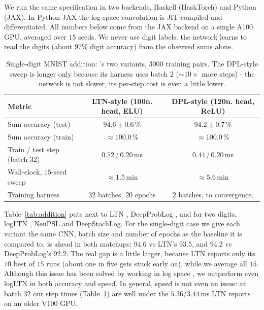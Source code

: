 \documentclass[anon]{../../journal-templates/NeSy26/nesy2026} %
\begin{document}
We run the same specification in two backends, Haskell (HaskTorch) and Python (JAX). In Python JAX the log-space convolution is JIT-compiled and
differentiated. All numbers below come from the JAX backend on a single A100 GPU, averaged over $15$
seeds. We never use digit labels: the network learns to read the digits (about $97\%$ digit accuracy)
from the observed sums alone.

\begin{table}[h]
  \centering
  \caption{Single-digit MNIST addition: \nesycattorch's two variants, $3000$ training pairs. The DPL-style sweep is longer only because its harness uses batch $2$ (${\sim}10\times$ more steps) - the network is not slower, its per-step cost is even a little lower.}
  \label{tab:mnist}
  \small
  \begin{tabular}{@{}lcc@{}}
    \textbf{Metric} & \textbf{LTN-style} (100n. head, ELU) & \textbf{DPL-style} (120n. head, ReLU) \\
    \midrule
    Sum accuracy (test)                  & $94.6 \pm 0.6$\,\% & $94.2 \pm 0.7$\,\% \\
    Sum accuracy (train)                 & $\approx 100.0$\,\% & $\approx 100.0$\,\% \\
    Train / test step (batch $32$) & $0.52$\,/\,$0.20$\,ms & $0.44$\,/\,$0.20$\,ms \\
    Wall-clock, $15$-seed sweep  & $\approx 1.5$\,min & $\approx 5.6$\,min \\
    Training harness                     &$32$ batches, $20$ epochs & $2$ batches, to convergence. \\
  \end{tabular}
  \end{table}

Table~\ref{tab:addition} puts \nesycattorch next to LTN \citep{DBLP:journals/ai/BadreddineGSS22},
DeepProbLog \citep{DBLP:journals/ai/ManhaeveDKDR21}, and for two digits, logLTN
\citep{badreddineLogLTN2023}, NeuPSL and DeepStochLog. For the single-digit case we give each \nesycattorch
variant the same CNN, batch size and number of epochs as the baseline it is compared to. \nesycattorch is ahead in both matchups: $94.6$ vs LTN's $93.5$, and $94.2$
vs DeepProbLog's $92.2$. The real gap is a little larger, because LTN reports only its $10$ best of
$15$ runs (about one in five gets stuck early on), while we average all $15$. Although this issue has been solved by working in log space \citep{badreddineLogLTN2023}, we outperform even logLTN in both accuracy and speed. In general, speed is not even an issue: at batch $32$ our step times (Table~\ref{tab:mnist}) are well under the $5.36$/$3.44$\,ms
LTN reports on an older V100 GPU.
\end{document}
